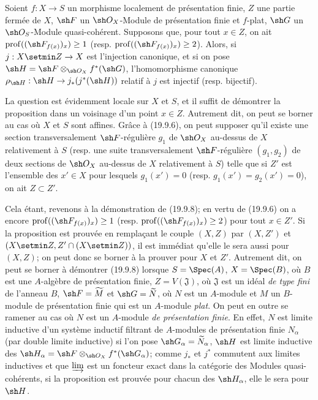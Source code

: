 \begin{proposition}[19.9.8]
\label{IV.19.9.8}
Soient $f:X\to S$ un morphisme localement de présentation finie, $Z$ une partie fermée de $X$, $\sh F$ un $\sh O_X$-Module de présentation finie et $f$-plat, $\sh G$ un $\sh O_S$-Module quasi-cohérent. Supposons que, pour tout $x\in Z$, on ait $\operatorname{prof}((\sh F_{f(x)})_x)\geq1$ \textup{(resp. $\operatorname{prof}((\sh F_{f(x)})_x)\geq2$)}. Alors, si $j:X\setmin Z\to X$ est l'injection canonique, et si on pose $\sh H=\sh F\otimes_{\sh O_X}f^*(\sh G)$, l'homomorphisme canonique $\rho_{\sh H}:\sh H\to j_*(j^*(\sh H))$ relatif à $j$ est injectif \textup{(resp.} bijectif\textup{)}.
\end{proposition}

La question est évidemment locale sur $X$ et $S$, et il suffit de démontrer la proposition dans un voisinage d'un point $x\in Z$. Autrement dit, on peut se borner au cas où $X$ et $S$ sont affines. Grâce à (19.9.6), on peut supposer qu'il existe une section transversalement $\sh F$-régulière $g_1$ de $\sh O_X$ au-dessus de $X$ relativement à $S$ (resp. une suite transversalement $\sh F$-régulière $(g_1,g_2)$ de deux sections de $\sh O_X$ au-dessus de $X$ relativement à $S$) telle que si $Z'$ est l'ensemble des $x'\in X$ pour lesquels $g_1(x')=0$ (resp. $g_1(x')=g_2(x')=0$), on ait $Z\subset Z'$.

Cela étant, revenons à la démonstration de (19.9.8); en vertu de (19.9.6) on a encore $\operatorname{prof}((\sh F_{f(x)})_x)\geq1$ (resp. $\operatorname{prof}((\sh F_{f(x)})_x)\geq2$) pour tout $x\in Z'$. Si la proposition est prouvée en remplaçant le couple $(X,Z)$ par $(X,Z')$ et $(X\setmin Z,Z'\cap(X\setmin Z))$, il est immédiat qu'elle le sera aussi pour $(X,Z)$; on peut donc se borner à la prouver pour $X$ et $Z'$. Autrement dit, on peut se borner à démontrer (19.9.8) lorsque $S=\Spec(A)$, $X=\Spec(B)$, où $B$ est une $A$-algèbre de présentation finie, $Z=V(\mathfrak J)$, où $\mathfrak J$ est un idéal \emph{de type fini} de l'anneau $B$, $\sh F=\widetilde M$ et $\sh G=\widetilde N$, où $N$ est un $A$-module et $M$ un $B$-module de présentation finie qui est un $A$-module \emph{plat}. On peut en outre se ramener au cas où $N$ est un $A$-module \emph{de présentation finie}. En effet, $N$ est limite inductive d'un système inductif filtrant de $A$-modules de présentation finie $N_\alpha$ (par double limite inductive) si l'on pose $\sh G_\alpha=\widetilde{N}_\alpha$, $\sh H$ est limite inductive des $\sh H_\alpha=\sh F\otimes_{\sh O_X}f^*(\sh G_\alpha)$; comme $j_*$ et $j^*$ commutent aux limites inductives et que $\varinjlim$ est un foncteur exact dans la catégorie des Modules quasi-cohérents, si la proposition est prouvée pour chacun des $\sh H_\alpha$, elle le sera pour $\sh H$.

